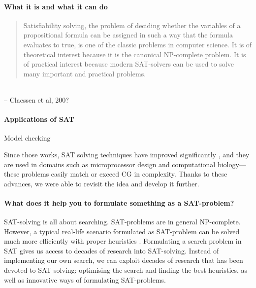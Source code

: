 \paragraph{What it is and what it can do}


\begin{quote}
Satisfiability solving, the problem of deciding whether the variables of a propositional formula can be assigned in such a way that the formula evaluates to true, is one of the classic problems in computer science. It is of theoretical interest because it is the canonical NP-complete problem. It is of practical interest because modern SAT-solvers can be used to solve many important and practical problems.\end{quote} \\
-- Claessen et al, 200?



\paragraph{Applications of SAT}

Model checking

Since those works, SAT solving techniques have improved significantly \cite{marques_silva2010}, and they are used in domains such as microprocessor design and computational 
biology---these problems easily match or exceed CG in complexity. 
Thanks to these advances, we were able to revisit the idea and develop it
further. 


\paragraph{What does it help you to formulate something as a SAT-problem?}

SAT-solving is all about searching.
SAT-problems are in general NP-complete. However, a typical real-life scenario formulated as SAT-problem can be solved much more efficiently with proper heuristics \cite{claessen_al}.
Formulating a search problem in SAT gives us access to decades of research into SAT-solving. 
Instead of implementing our own search, we can exploit decades of research that has been devoted to SAT-solving: optimising the search and finding the best heuristics, as well as innovative ways of formulating SAT-problems.